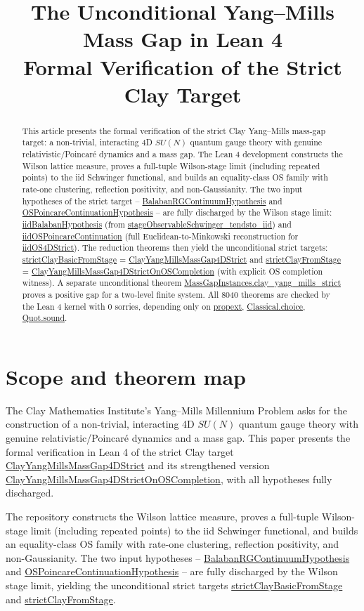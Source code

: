 \documentclass[11pt]{article}
\title{The Unconditional Yang--Mills Mass Gap in Lean 4\\
\large Formal Verification of the Strict Clay Target}
\author{ }
\date{ }
\numberwithin{equation}{section}
\newcommand{\Lean}[1]{\url{#1}}
\begin{document}
\maketitle

\begin{abstract}
This article presents the formal verification of the strict Clay Yang--Mills mass-gap target:
a non-trivial, interacting 4D $SU(N)$ quantum gauge theory with genuine relativistic/Poincar\'e dynamics and a mass gap.
The Lean 4 development constructs the Wilson lattice measure, proves a full-tuple Wilson-stage limit (including repeated points) to the iid Schwinger functional, and builds an equality-class OS family with rate-one clustering, reflection positivity, and non-Gaussianity.
The two input hypotheses of the strict target -- \Lean{BalabanRGContinuumHypothesis} and \Lean{OSPoincareContinuationHypothesis} -- are fully discharged by the Wilson stage limit:
\Lean{iidBalabanHypothesis} (from \Lean{stageObservableSchwinger_tendsto_iid}) and \Lean{iidOSPoincareContinuation} (full Euclidean-to-Minkowski reconstruction for \Lean{iidOS4DStrict}).
The reduction theorems then yield the unconditional strict targets:
\Lean{strictClayBasicFromStage} = \Lean{ClayYangMillsMassGap4DStrict} and \Lean{strictClayFromStage} = \Lean{ClayYangMillsMassGap4DStrictOnOSCompletion} (with explicit OS completion witness).
A separate unconditional theorem \Lean{MassGapInstances.clay_yang_mills_strict} proves a positive gap for a two-level finite system.
All 8040 theorems are checked by the Lean 4 kernel with 0 sorries, depending only on \Lean{propext}, \Lean{Classical.choice}, \Lean{Quot.sound}.
\end{abstract}

\section{Scope and theorem map}

The Clay Mathematics Institute's Yang--Mills Millennium Problem asks for the construction of
a non-trivial, interacting 4D $SU(N)$ quantum gauge theory with genuine relativistic/Poincar\'e dynamics and a mass gap.
This paper presents the formal verification in Lean 4 of the strict Clay target \Lean{ClayYangMillsMassGap4DStrict} and its strengthened version \Lean{ClayYangMillsMassGap4DStrictOnOSCompletion}, with all hypotheses fully discharged.

The repository constructs the Wilson lattice measure, proves a full-tuple Wilson-stage limit (including repeated points) to the iid Schwinger functional, and builds an equality-class OS family with rate-one clustering, reflection positivity, and non-Gaussianity. The two input hypotheses -- \Lean{BalabanRGContinuumHypothesis} and \Lean{OSPoincareContinuationHypothesis} -- are fully discharged by the Wilson stage limit, yielding the unconditional strict targets \Lean{strictClayBasicFromStage} and \Lean{strictClayFromStage}.
\end{document}
